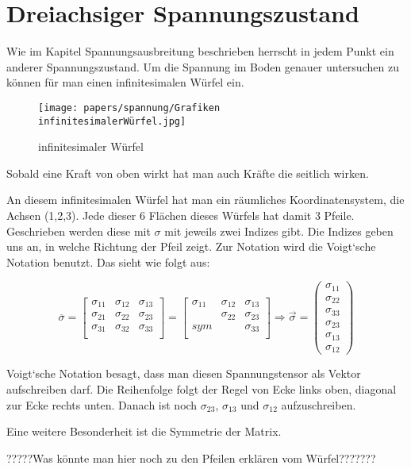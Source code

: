 \section{Dreiachsiger Spannungszustand\label{spannung:section:Dreiachsiger Spannungszustand}}
Wie im Kapitel Spannungsausbreitung beschrieben herrscht in jedem Punkt ein anderer Spannungszustand.
Um die Spannung im Boden genauer untersuchen zu können für man einen infinitesimalen Würfel ein.
\begin{figure}
	\centering
	\texttt{[image: papers/spannung/Grafiken\\infinitesimalerWürfel.jpg]}
	\caption{infinitesimaler Würfel}
	\label{fig:infintesimaler-wurfel}
\end{figure}

Sobald eine Kraft von oben wirkt hat man auch Kräfte die seitlich wirken.

An diesem infinitesimalen Würfel hat man ein räumliches Koordinatensystem, die Achsen (1,2,3).
Jede dieser 6 Flächen dieses Würfels hat damit 3 Pfeile.
Geschrieben werden diese mit $\sigma$ mit jeweils zwei Indizes gibt.
Die Indizes geben uns an, in welche Richtung der Pfeil zeigt.
Zur Notation wird die Voigt`sche Notation benutzt. Das sieht wie folgt aus:

\[
\overline{\sigma}
=
\left[ \begin{array}{rrr}
	\sigma_{11} & \sigma_{12} & \sigma_{13} \\ 
	\sigma_{21} & \sigma_{22} & \sigma_{23} \\
	\sigma_{31} & \sigma_{32} & \sigma_{33} \\ 
\end{array}\right]
=
\left[ \begin{array}{rrr}
	\sigma_{11} & \sigma_{12} & \sigma_{13} \\ 
	 & \sigma_{22} & \sigma_{23} \\
	sym &  & \sigma_{33} \\ 
\end{array}\right]
\Rightarrow
\overrightarrow{\sigma}
=
\left(\begin{array}{c}\sigma_{11}\\\sigma_{22}\\\sigma_{33}\\\sigma_{23}\\\sigma_{13}\\\sigma_{12}\end{array}\right)
\]

Voigt`sche Notation besagt, dass man diesen Spannungstensor als Vektor aufschreiben darf.
Die Reihenfolge folgt der Regel von Ecke links oben, diagonal zur Ecke rechts unten.
Danach ist noch $\sigma_{23}$, $\sigma_{13}$ und $\sigma_{12}$ aufzuschreiben.

Eine weitere Besonderheit ist die Symmetrie der Matrix.

?????Was könnte man hier noch zu den Pfeilen erklären vom Würfel???????



